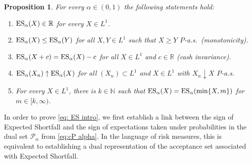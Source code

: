 \documentclass[12pt]{article}
\theoremstyle{plain}
\newtheorem{proposition}[theorem]{Proposition}
\theoremstyle{definition}
\theoremstyle{remark}
\numberwithin{equation}{section}
\newcommand{\probp}{P}
\newcommand{\R}{\mathbb{R}}
\newcommand{\N}{\mathbb{N}}
\newcommand{\cF}{{\mathcal{F}}}
\newcommand{\cP}{\mathcal{P}}
\newcommand{\VaR}{\mathop {\rm VaR}\nolimits}
\newcommand{\ES}{\mathop {\rm ES}\nolimits}
\newcommand{\dd}{\,\mathrm{d}}
\begin{document}

\begin{proposition}
\label{prop:ES}
For every $\alpha\in(0,1)$ the following statements hold:
\begin{enumerate}
    \item $\ES_\alpha(X)\in \R$ for every $X\in L^1$.
    \item $\ES_\alpha(X)\le\ES_\alpha(Y)$ for all $X,Y\in L^1$ such that $X\ge Y$ $\probp$-a.s.\ (monotonicity).
    \item $\ES_\alpha(X+c)=\ES_\alpha(X)-c$ for all $X\in L^1$ and $c\in\R$ (cash invariance).
    \item $\ES_\alpha(X_n)\uparrow\ES_\alpha(X)$ for all $(X_n)\subset L^1$ and $X\in L^1$ with $X_n\downarrow X$ $\probp$-a.s.
    \item For every $X\in L^1$, there is $k\in\N$ such that $\ES_\alpha(X)=\ES_\alpha(\min\{X,m\})$ for $m\in[k,\infty)$.
\end{enumerate}
\end{proposition}

\smallskip

In order to prove \eqref{eq: ES intro}, we first establish a link between the sign of Expected Shortfall and the sign of expectations taken under probabilities in the dual set $\cP_\alpha$ from \eqref{eq:cP alpha}.
In the language of risk measures, this is equivalent to establishing a dual representation of the acceptance set associated with Expected Shortfall. 
\end{document}
